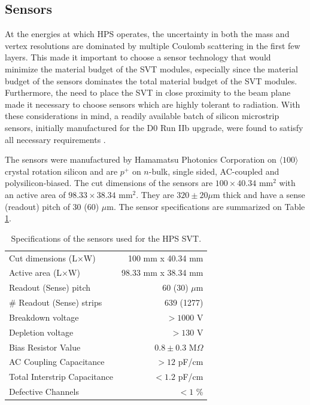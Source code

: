 \subsection{Sensors}

At the energies at which HPS operates, the uncertainty in both the mass and
vertex resolutions are dominated by multiple Coulomb scattering in the first 
few layers.  This made it important to choose a sensor technology that would 
minimize the material budget of the SVT modules, especially since the material
budget of the sensors dominates the total material budget of the SVT modules.
Furthermore, the need to place the SVT in close proximity
to the beam plane made it necessary to choose sensors which are highly tolerant
to radiation.  With these 
considerations in mind, a readily available batch of silicon microstrip sensors,
initially manufactured for the D0 Run IIb upgrade, were found to satisfy all 
necessary requirements \cite{D0Collab:2003}.

The sensors were manufactured by Hamamatsu Photonics Corporation on 
$\langle 100 \rangle$ crystal rotation silicon and are $p^{+}$ on $n$-bulk, 
single sided, AC-coupled and polysilicon-biased. The cut dimensions of the 
sensors are $100 \times 40.34$ mm$^{2}$ with an active area of 
$98.33 \times 38.34$ mm$^{2}$. They are $320 \pm 20 \mu$m thick and have a sense
(readout) pitch of 30 (60) $\mu$m. The sensor specifications are summarized on 
Table \ref{tab:sensor_specs}.
\begin{table}[t]
    \centering
    \begin{tabular}{lr}
        \toprule
        Cut dimensions (L$\times$W)     & 100 mm x 40.34 mm \\
        Active area (L$\times$W)        & 98.33 mm x 38.34 mm \\
        Readout (Sense) pitch           & 60 (30) $\mu$m \\
        \# Readout (Sense) strips       & 639 (1277) \\
        Breakdown voltage               & $>1000$ V \\
        Depletion voltage               & $> 130$ V \\
        Bias Resistor Value             & $0.8 \pm 0.3$ M$\Omega$ \\
        AC Coupling Capacitance         & $>12$ pF/cm \\
        Total Interstrip Capacitance    & $< 1.2$ pF/cm \\
        Defective Channels              & $<1$ \% \\
        \bottomrule
    \end{tabular}
    \caption{Specifications of the sensors used for the HPS SVT.}
    \label{tab:sensor_specs}
\end{table}

